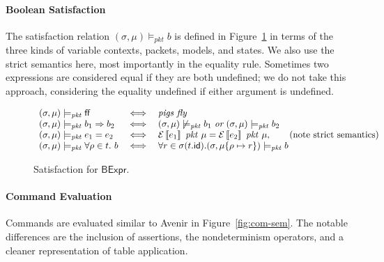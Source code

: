\documentclass{article}
\newcommand{\pkt}{\mathit{pkt}}
\newcommand{\error}{\mathsf{error}}
\newcommand{\denote}[1]{\left\llbracket#1\right\rrbracket}
\newcommand{\edenote}[1]{\mathcal{E}\denote{#1}}
\newcommand{\FALSE}{\mathsf{ff}}
\newcommand{\BExpr}{\mathsf{BExpr}}
\newcommand{\id}{\mathsf{id}}
\newcommand{\satisfy}[3]{({#1,#3}) \models_{#2}}
\newcommand{\notsatisfy}[3]{({#1,#3})\not\models_{#2}}
\begin{document}
\paragraph{Boolean Satisfaction}
The satisfaction relation $\satisfy \sigma \pkt \mu b$ is defined in
Figure~\ref{fig:bool-satis} in terms of the three kinds of variable contexts,
packets, models, and states. We also use the strict semantics here, most
importantly in the equality rule. Sometimes two expressions are considered equal
if they are both undefined; we do not take this approach, considering the
equality undefined if either argument is undefined.

\begin{figure}
  \[\begin{array}{l>{\iff}cl}
  \satisfy \sigma \pkt \mu \FALSE && \textit{pigs fly} \\
  \satisfy \sigma \pkt \mu b_1 \Rightarrow b_2 &&
  \notsatisfy \sigma \pkt \mu  b_1~\textit{or}~
  \satisfy \sigma \pkt \mu b_2\\
  \satisfy \sigma \pkt \mu e_1 = e_2 &&
  \edenote{e_1}~\pkt~\mu = \edenote{e_2}~\pkt~\mu, \qquad
  \text{(note strict semantics)} \\
  \satisfy \sigma \pkt \mu \forall \rho \in t. ~b &&
  \forall r \in \sigma(t.\id).
  \satisfy \sigma \pkt {\mu\{\rho \mapsto r\}} b
  \end{array}
  \]
  \todo[inline]{Clarify $\error$ states} 
  \caption{Satisfaction for $\BExpr$.}
  \label{fig:bool-satis}
\end{figure}

\paragraph{Command Evaluation}
Commands are evaluated similar to Avenir in Figure~\ref{fig:com-sem}. The
notable differences are the inclusion of assertions, the nondeterminism
operators, and a cleaner representation of table application.
\end{document}
